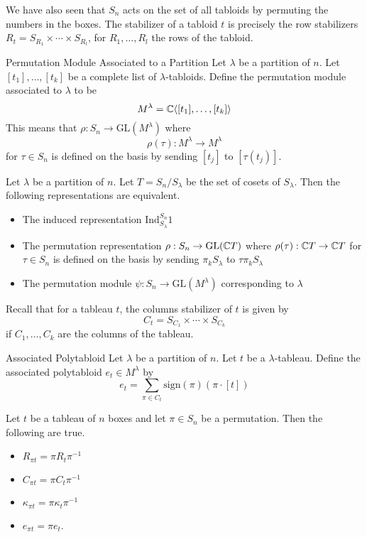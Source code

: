 \documentclass[a4paper]{article}
\begin{document}
We have also seen that $S_n$ acts on the set of all tabloids by permuting the numbers in the boxes. The stabilizer of a tabloid $t$ is precisely the row stabilizers $R_t=S_{R_1}\times\cdots\times S_{R_l}$, for $R_1,\dots,R_l$ the rows of the tabloid. 

\begin{defn}{Permutation Module Associated to a Partition}{} Let $\lambda$ be a partition of $n$. Let $[t_1],\dots,[t_k]$ be a complete list of $\lambda$-tabloids. Define the permutation module associated to $\lambda$ to be $$M^\lambda=\mathbb{C}\langle[t_1],\dots,[t_k]\rangle$$ This means that $\rho:S_n\to\text{GL}(M^\lambda)$ where $$\rho(\tau):M^\lambda\to M^\lambda$$ for $\tau\in S_n$ is defined on the basis by sending $[t_j]$ to $[\tau(t_j)]$. 
\end{defn}

\begin{prp}{}{} Let $\lambda$ be a partition of $n$. Let $T=S_n/S_\lambda$ be the set of cosets of $S_\lambda$. Then the following representations are equivalent. 
\begin{itemize}
\item The induced representation $\text{Ind}_{S_\lambda}^{S_n}1$
\item The permutation representation $\rho:S_n\to\text{GL}(\mathbb{C} T)$ where $\rho(\tau):\mathbb{C} T\to\mathbb{C} T$ for $\tau\in S_n$ is defined on the basis by sending $\pi_kS_\lambda$ to $\tau\pi_kS_\lambda$
\item The permutation module $\psi:S_n\to\text{GL}(M^\lambda)$ corresponding to $\lambda$
\end{itemize}
\end{prp}

Recall that for a tableau $t$, the columns stabilizer of $t$ is given by $$C_t=S_{C_1}\times\cdots\times S_{C_k}$$ if $C_1,\dots,C_k$ are the columns of the tableau. 

\begin{defn}{Associated Polytabloid}{} Let $\lambda$ be a partition of $n$. Let $t$ be a $\lambda$-tableau. Define the associated polytabloid $e_t\in M^\lambda$ by $$e_t=\sum_{\pi\in C_t}\text{sign}(\pi)(\pi\cdot[t])$$
\end{defn}

\begin{lmm}{}{} Let $t$ be a tableau of $n$ boxes and let $\pi\in S_n$ be a permutation. Then the following are true. 
\begin{itemize}
\item $R_{\pi t}=\pi R_t\pi^{-1}$
\item $C_{\pi t}=\pi C_t\pi^{-1}$
\item $\kappa_{\pi t}=\pi\kappa_t\pi^{-1}$
\item $e_{\pi t}=\pi e_t$. 
\end{itemize}
\end{lmm}
\end{document}
